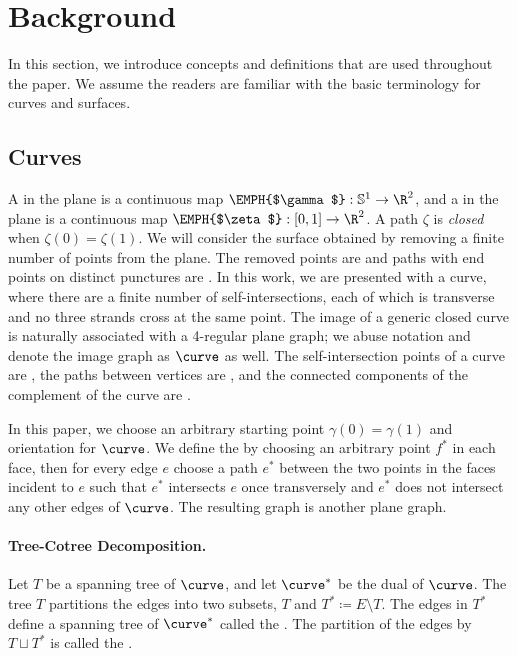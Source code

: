 
\section{Background}
\label{sec:background}


In this section, we introduce concepts and definitions that are used throughout the paper.
We assume the readers are familiar with the basic terminology for curves and surfaces.

\subsection{Curves}

A  in the plane is a continuous map 
$\EMPH{$\gamma$}: \mathbb{S}^1 \to \R^2$, and a  in the plane is a 
continuous map $\EMPH{$\zeta$}: [0,1]\to \R^2$.
A path $\zeta$ is \emph{closed} when $\zeta(0)=\zeta(1)$.
We will consider the surface obtained by removing a finite number
of points from the plane. The removed points are 
and paths with end points on distinct punctures are .
%
In this work, we are presented with a  curve,
where there are a finite number of self-intersections, each of
which is transverse and no three strands cross at the same point.
The image of a generic closed curve is naturally associated with a 4-regular plane graph;
we abuse notation and denote the image graph as {$\curve$} as well.
The self-intersection points of a curve are ,
the paths between vertices are , and the connected
components of the complement of the curve are .

%
In this paper, we choose an arbitrary starting point $\gamma(0)=\gamma(1)$ and 
orientation for $\curve$.
We define the  by choosing
an arbitrary point $f^*$ in each face, then for every edge $e$
choose a path $e^*$ between the two points in the faces incident to $e$
such that $e^*$ intersects $e$ once transversely and $e^*$ does not intersect
any other edges of $\curve$. The resulting graph is another plane graph.




\paragraph*{Tree-Cotree Decomposition.}
Let $T$ be a spanning tree of $\curve$, and let $\curve^*$ be the dual of $\curve$.
The tree $T$ partitions the edges into two subsets, $T$ and $T^* \coloneqq E \setminus T$.
The edges in $T^*$ define a spanning tree of $\curve^*$ called the .
The partition of the edges by $T \sqcup T^*$ is called the .


